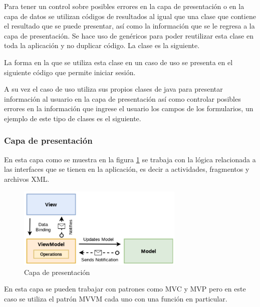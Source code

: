 Para tener un control sobre posibles errores en la capa de presentación o en la capa de datos se utilizan códigos de resultados al igual que una clase que contiene el resultado que se puede presentar, así como la información que se le regresa a la capa de presentación. Se hace uso de genéricos para poder reutilizar esta clase en toda la aplicación y no duplicar código. La clase es la siguiente.

%

La forma en la que se utiliza esta clase en un caso de uso se presenta en el siguiente código que permite iniciar sesión.

%

A su vez el caso de uso utiliza sus propios clases de java para presentar información al usuario en la capa de presentación así como controlar posibles errores en la información que ingrese el usuario los campos de los formularios, un ejemplo de este tipo de clases es el siguiente.

%

\subsubsection{Capa de presentación}
En esta capa como se muestra en la figura \ref{fig:capa-presentacion} se trabaja con la lógica relacionada a las interfaces que se tienen en la aplicación, es decir a actividades, fragmentos y archivos XML.

\begin{figure}[h]
	\centering
	\includegraphics[width=300px]{capitulo5/android/img/capa-presentacion.png}
	\caption{Capa de presentación \cite{cleanWayReload}}
	\label{fig:capa-presentacion}
\end{figure}

En esta capa se pueden trabajar con patrones como MVC y MVP pero en este caso se utiliza el patrón MVVM cada uno con una función en particular. \cite{cleanWayReload}

